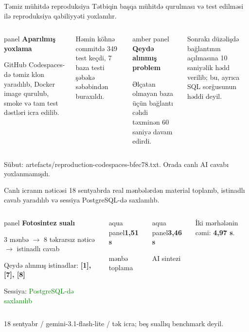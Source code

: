 \documentclass[aspectratio=169,11pt]{beamer}
\newenvironment{panel}{\begin{beamercolorbox}[wd=\linewidth,sep=1.2ex,rounded=true]{panel}}{\end{beamercolorbox}}
\newenvironment{aquapanel}{\begin{beamercolorbox}[wd=\linewidth,sep=1.2ex,rounded=true]{aqua panel}}{\end{beamercolorbox}}
\newenvironment{amberpanel}{\begin{beamercolorbox}[wd=\linewidth,sep=1.2ex,rounded=true]{amber panel}}{\end{beamercolorbox}}
\newcommand{\lead}[1]{{\color{muted}\normalsize #1}\par\vspace{0.75em}}
\newcommand{\tinyref}[1]{{\color{muted}\scriptsize #1}}
\newcommand{\metric}[2]{{\color{teal}\Large\bfseries #1}\par{\small #2}}
\newcommand{\speaker}{ii1ahe}
\begin{document}
\begin{frame}{Təmiz mühitdə reproduksiya}
  \lead{Tətbiqin başqa mühitdə qurulması və test edilməsi ilə reproduksiya qabiliyyəti yoxlanılır.}
  \begin{columns}[T,onlytextwidth]
      \begin{panel}
        \textbf{Aparılmış yoxlama}\par\vspace{2mm}
        \small GitHub Codespaces-də təmiz klon yaradılıb, Docker image qurulub, smoke və tam test dəstləri icra edilib.
      \end{panel}
      \vspace{2mm}
      \small Həmin köhnə commitdə 349 test keçdi, 7 baza testi şəbəkə səbəbindən buraxıldı.
      \begin{amberpanel}
        \textbf{Qeydə alınmış problem}\par\vspace{2mm}
        \small Əlçatan olmayan baza üçün bağlantı cəhdi təxminən 60 saniyə davam edirdi.
      \end{amberpanel}
      \vspace{2mm}
      \small Sonrakı düzəlişdə bağlantının açılmasına 10 saniyəlik hədd verilib; bu, ayrıca SQL sorğusunun həddi deyil.
  \end{columns}
  \vspace{3mm}
  \tinyref{Sübut: artefacts/reproduction-codespaces-bfec78.txt. Orada canlı AI cavabı yoxlanmamışdı.}
\end{frame}

\renewcommand{\speaker}{ii1ahe}
\begin{frame}{Canlı icranın nəticəsi}
  \lead{18 sentyabrda real mənbələrdən material toplanıb, istinadlı cavab yaradılıb və sessiya PostgreSQL-də saxlanılıb.}
  \begin{columns}[T,onlytextwidth]
      \begin{panel}
        \textbf{Fotosintez sualı}\par\vspace{2mm}
        \small 3 mənbə $\rightarrow$ 8 təkrarsız nəticə $\rightarrow$ istinadlı cavab\par
        \small Qeydə alınmış istinadlar: \textbf{[1], [7], [8]}\par
        \small Sessiya: \textcolor{green}{PostgreSQL-də saxlanılıb}
      \end{panel}
      \begin{aquapanel}\metric{1,51 s}{mənbə toplama}\end{aquapanel}
      \vspace{2mm}
      \begin{aquapanel}\metric{3,46 s}{AI sintezi}\end{aquapanel}
      \vspace{2mm}
      \small İki mərhələnin cəmi: \textbf{4,97 s}.
  \end{columns}
  \vspace{1mm}
  \tinyref{18 sentyabr / gemini-3.1-flash-lite / tək icra; beş suallıq benchmark deyil.}
\end{frame}
\end{document}
